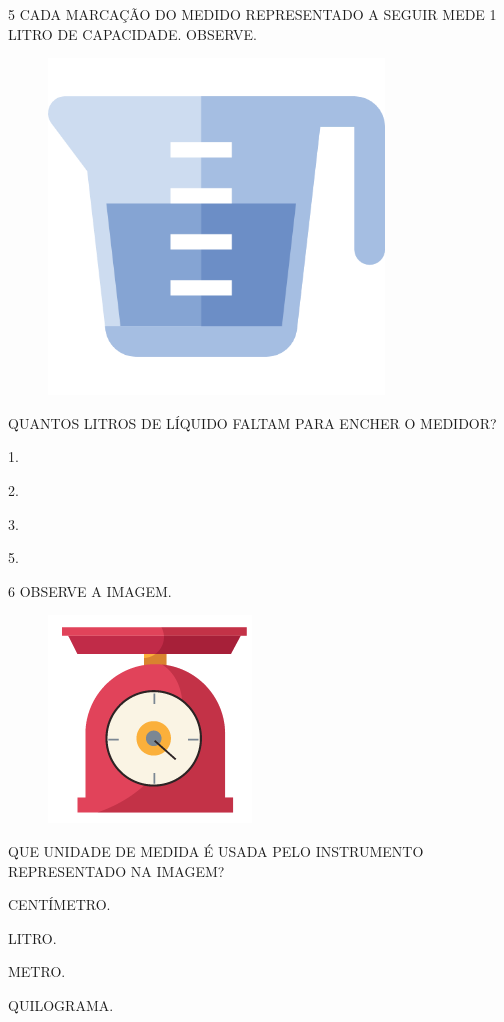 \pagebreak
\num{5} CADA MARCAÇÃO DO MEDIDO REPRESENTADO A SEGUIR MEDE 1 LITRO DE CAPACIDADE. OBSERVE.


\begin{figure}[htpb!]
\centering
\includegraphics[width=.2\textwidth]{media/image113.png}
\end{figure}

QUANTOS LITROS DE LÍQUIDO FALTAM PARA ENCHER O MEDIDOR?

\begin{escolha}[itemsep=0pt]
\item 1.

\item 2.

\item 3.

\item 5.
\end{escolha}

\num{6} OBSERVE A IMAGEM.


\begin{figure}[htpb!]
\centering
\includegraphics[width=.25\textwidth]{./media/SAEB_1ANO_MAT_FIGURA123.png}
\end{figure}

QUE UNIDADE DE MEDIDA É USADA PELO INSTRUMENTO REPRESENTADO NA IMAGEM?

\begin{escolha}[itemsep=0pt]
\item CENTÍMETRO.

\item LITRO.

\item METRO.

\item QUILOGRAMA.
\end{escolha}

